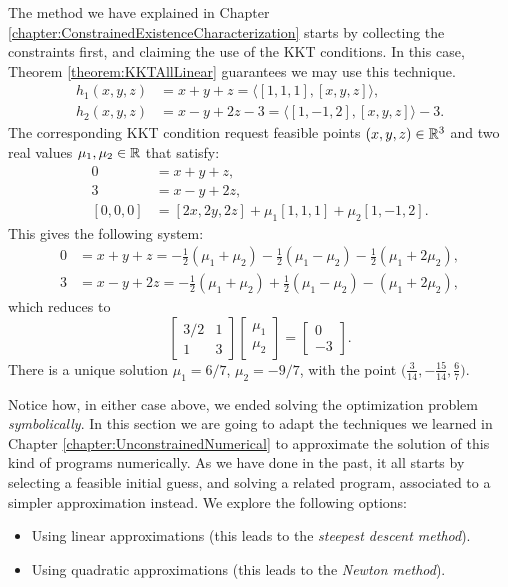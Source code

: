 \begin{example}
The method we have explained in Chapter \ref{chapter:ConstrainedExistenceCharacterization} starts by collecting the constraints first, and claiming the use of the KKT conditions.  In this case, Theorem \ref{theorem:KKTAllLinear} guarantees we may use this technique.
\begin{align*}
h_1(x,y,z) &= x+y+z = \langle [1,1,1], [x,y,z]\rangle, \\
h_2(x,y,z) &= x-y+2z-3 = \langle [1,-1,2],[x,y,z] \rangle -3.
\end{align*}
The corresponding KKT condition request feasible points $(x,y,z) \in \mathbb{R}^3$ and two real values $\mu_1, \mu_2 \in \mathbb{R}$ that satisfy:
\begin{align*}
0 &= x+y+z, \\
3 &= x-y+2z, \\
[0,0,0] &= [2x,2y, 2z] + \mu_1 [1,1,1] + \mu_2 [1,-1,2].
\end{align*}
This gives the following system:
\begin{align*}
0 &= x+y+z = -\tfrac{1}{2}(\mu_1+\mu_2) -\tfrac{1}{2}(\mu_1-\mu_2) -\tfrac{1}{2}(\mu_1+2\mu_2), \\
3 &= x-y+2z = -\tfrac{1}{2}(\mu_1+\mu_2) + \tfrac{1}{2}(\mu_1-\mu_2) - (\mu_1+2\mu_2),
\end{align*}
which reduces to 
\begin{equation*}
\begin{bmatrix}  3/2 & 1 \\ 1 & 3 \end{bmatrix} \begin{bmatrix} \mu_1 \\ \mu_2 \end{bmatrix} = \begin{bmatrix} 0 \\ -3 \end{bmatrix}.
\end{equation*}
There is a unique solution $\mu_1 = 6/7$, $\mu_2 = -9/7$, with the point $\big( \tfrac{3}{14}, -\tfrac{15}{14}, \tfrac{6}{7} \big)$.
\end{example}

\separator

Notice how, in either case above, we ended solving the optimization problem \emph{symbolically}.  In this section we are going to adapt the techniques we learned in Chapter \ref{chapter:UnconstrainedNumerical} to approximate the solution of this kind of programs numerically.  As we have done in the past, it all starts by selecting a feasible initial guess, and solving a related program, associated to a simpler approximation instead.  We explore the following options:
\begin{itemize}
	\item Using linear approximations (this leads to the \emph{steepest des\-cent me\-thod}).
	\item Using quadratic approximations (this leads to the \emph{Newton method}).
\end{itemize}

